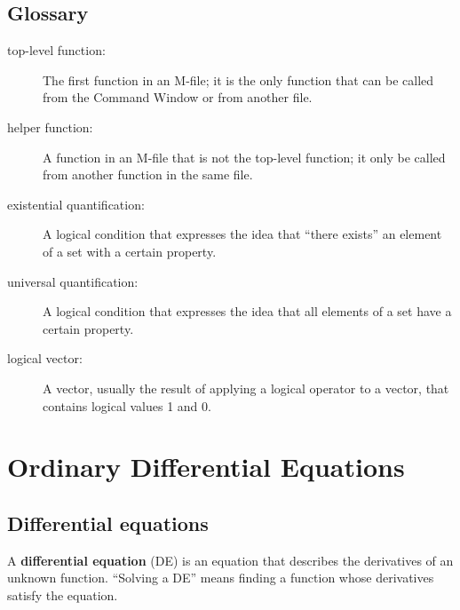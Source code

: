 \documentclass[
]{book}
\numberwithin{Answer}{chapter}
\numberwithin{Exercise}{chapter}
\begin{document}
\section{Glossary}

\begin{description}

\item[top-level function:]  The first function in an M-file;
it is the only function that can be called from the Command
Window or from another file.

\item[helper function:] A function in an M-file that is not
the top-level function; it only be called from another function
in the same file.

\item[existential quantification:] A logical condition that expresses
the idea that ``there exists'' an element of a set with a certain
property.

\item[universal quantification:] A logical condition that expresses
the idea that all elements of a set have a certain property.

\item[logical vector:] A vector, usually the result of applying a logical
operator to a vector, that contains logical values 1 and 0.


\end{description}




\chapter{Ordinary Differential Equations}


\section{Differential equations}
\label{diffeq}

A {\bf differential equation} (DE) is an equation that describes the
derivatives of an unknown function.  ``Solving a DE'' means finding a
function whose derivatives satisfy the equation.
\end{document}
